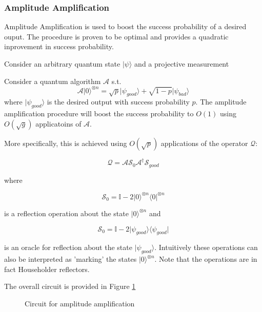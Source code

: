 \documentclass{article}
\begin{document}
\subsubsection{Amplitude Amplification}

Amplitude Amplification is used to boost the success probability of a desired ouput. The procedure is proven to be optimal and provides a quadratic inprovement in success probability.

Consider an arbitrary quantum state $\lvert \psi \rangle$ and a projective measurement 

Consider a quantum algorithm  $\mathcal{A} $ s.t. 
\begin{equation}
\mathcal{A} \lvert 0 \rangle^{\otimes n} = \sqrt{p} \lvert \psi_{good} \rangle + \sqrt{1-p} \lvert \psi_{bad} \rangle
\end{equation}
 where $ \lvert \psi_{good} \rangle $ is the desired output with success probability $p$. The amplitude amplification procedure will boost the success probability to $O(1)$ using $O( \sqrt{g} )$ applicatoins of $\mathcal{A}$.

More specifically, this is achieved using $O(\sqrt{p})$ applications of the operator $\mathcal{Q}$:

\begin{equation}
\mathcal{Q} = \mathcal{A} \mathcal{S}_0 \mathcal{A}^\dagger \mathcal{S}_{good}
\end{equation}

where 

\begin{equation}
\mathcal{S}_0  = \mathbb{I} - 2 \lvert 0 \rangle ^{\otimes n} \langle 0 \rvert  ^{\otimes n}
\end{equation}

is a reflection operation about the state $\lvert 0 \rangle ^{\otimes n}$ and 

\begin{equation}
\mathcal{S}_0  = \mathbb{I} - 2 \lvert \psi_{good} \rangle \langle \psi_{good} \rvert  
\end{equation}

is an oracle for reflection about the state $ \lvert \psi_{good} \rangle $. Intuitively these operations can also be interpreted as 'marking' the states $\lvert 0 \rangle ^{\otimes n}$. Note that the operations are in fact Householder reflectors.

The overall circuit is provided in Figure \ref{fig:amplitude_amplification}


\begin{figure}[h]

\centering


\caption{Circuit for amplitude amplification}

\label{fig:amplitude_amplification}

\end{figure}
\end{document}
